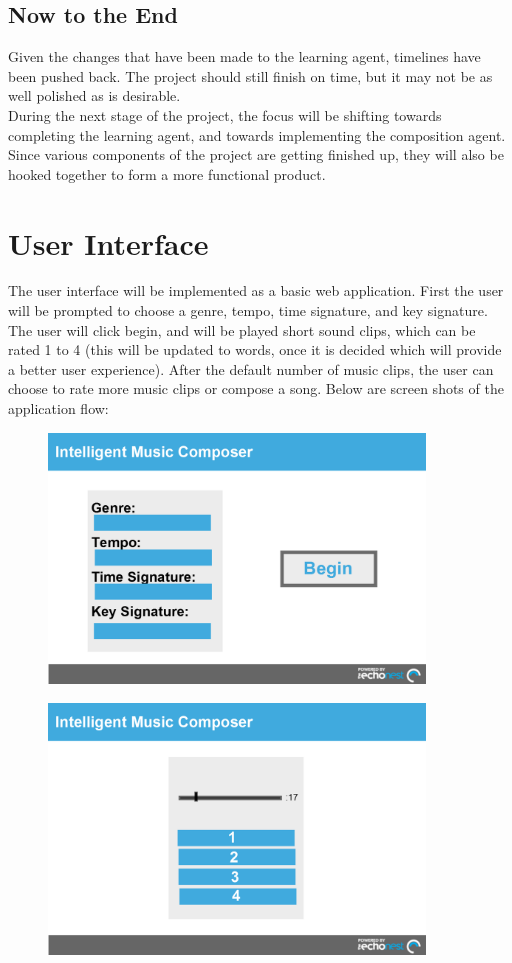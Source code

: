 \documentclass{article}
\begin{document}
\subsection{Now to the End}
Given the changes that have been made to the learning agent, timelines have been pushed back. The project
should still finish on time, but it may not be as well polished as is desirable.
\\
During the next stage of the project, the focus will be shifting towards completing the learning agent, and
towards implementing the composition agent. Since various components of the project are getting finished up,
they will also be hooked together to form a more functional product.

\section{User Interface}
The user interface will be implemented as a basic web application. First the user will be prompted 
to choose a genre, tempo, time signature, and key signature.  The user will click begin, and will 
be played short sound clips, which can be rated 1 to 4 (this will be updated to words, once it is 
decided which will provide a better user experience).  After the default number of music clips, the 
user can choose to rate more music clips or compose a song.  
Below are screen shots of the application flow:

\begin{figure}[H]
\centerline{\includegraphics[width=10cm]{begin.png}}
\end{figure}

\begin{figure}[H]
\centerline{\includegraphics[width=10cm]{pref.png}}
\end{figure}
\end{document}
